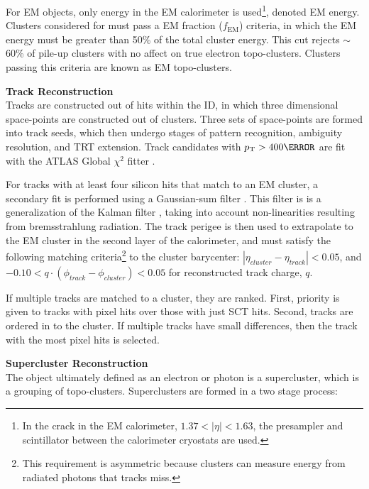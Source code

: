 For \gls{EM} objects, only energy in the \gls{EM} calorimeter is used\footnote{In the crack in the \gls{EM} calorimeter, $1.37<|\eta|<1.63$, the presampler and scintillator between the calorimeter cryostats are used.}, denoted \gls{EM} energy. Clusters considered for must pass a \gls{EM} fraction ($f_{\text{EM}}$) criteria, in which the \gls{EM} energy must be greater than 50\% of the total cluster energy. This cut rejects $\sim$60\% of pile-up clusters with no affect on true electron topo-clusters. Clusters passing this criteria are known as \gls{EM} topo-clusters.

\noindent\textbf{Track Reconstruction}\\ %
\indent Tracks are constructed out of hits within the \gls{ID}, in which three dimensional space-points are constructed out of clusters. Three sets of space-points are formed into track seeds, which then undergo stages of pattern recognition, ambiguity resolution, and \gls{TRT} extension. Track candidates with $\pt > \unit{400}{\MeV}$ are fit with the ATLAS Global $\chi^2$ fitter \cite{chi-2-fitter}.

For tracks with at least four silicon hits that match to an \gls{EM} cluster, a secondary fit is performed using a Gaussian-sum filter \cite{gaussian-sum-filter}. This filter is is a generalization of the Kalman filter \cite{kalman-filter}, taking into account non-linearities resulting from bremsstrahlung radiation. The track perigee is then used to extrapolate to the \gls{EM} cluster in the second layer of the calorimeter, and must satisfy the following matching criteria\footnote{This requirement is asymmetric because clusters can measure energy from radiated photons that tracks miss.} to the cluster barycenter: $|\eta_{cluster} - \eta_{track}| < 0.05$, and $-0.10 < q \cdot (\phi_{track}-\phi_{cluster}) < 0.05$ for reconstructed track charge, $q$.

If multiple tracks are matched to a cluster, they are ranked. First, priority is given to tracks with pixel hits over those with just \gls{SCT} hits. Second, tracks are ordered in \Dr to the cluster. If multiple tracks have small \Dr differences, then the track with the most pixel hits is selected. 


\noindent\textbf{Supercluster Reconstruction}\\ 
\indent The object ultimately defined as an electron or photon is a supercluster, which is a grouping of topo-clusters.  Superclusters are formed in a two stage process:

